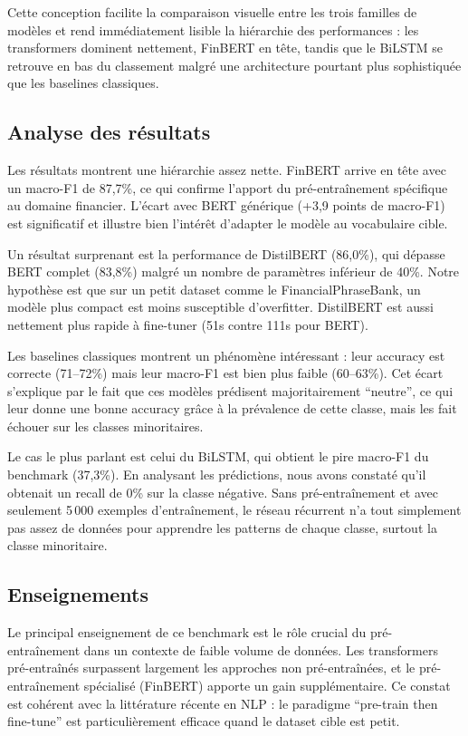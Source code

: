 \documentclass[12pt, a4paper]{article}
\begin{document}
Cette conception facilite la comparaison visuelle entre les trois familles de
modèles et rend immédiatement lisible la hiérarchie des performances : les
transformers dominent nettement, FinBERT en tête, tandis que le BiLSTM se retrouve
en bas du classement malgré une architecture pourtant plus sophistiquée que les
baselines classiques.

\subsection{Analyse des résultats}

Les résultats montrent une hiérarchie assez nette. FinBERT arrive en tête avec un
macro-F1 de 87,7\%, ce qui confirme l'apport du pré-entraînement spécifique au
domaine financier. L'écart avec BERT générique (+3,9 points de macro-F1) est
significatif et illustre bien l'intérêt d'adapter le modèle au vocabulaire cible.

Un résultat surprenant est la performance de DistilBERT (86,0\%), qui dépasse BERT
complet (83,8\%) malgré un nombre de paramètres inférieur de 40\%. Notre hypothèse
est que sur un petit dataset comme le FinancialPhraseBank, un modèle plus compact
est moins susceptible d'overfitter. DistilBERT est aussi nettement plus rapide à
fine-tuner (51s contre 111s pour BERT).

Les baselines classiques montrent un phénomène intéressant : leur accuracy est
correcte (71--72\%) mais leur macro-F1 est bien plus faible (60--63\%). Cet écart
s'explique par le fait que ces modèles prédisent majoritairement ``neutre'', ce qui
leur donne une bonne accuracy grâce à la prévalence de cette classe, mais les fait
échouer sur les classes minoritaires.

Le cas le plus parlant est celui du BiLSTM, qui obtient le pire macro-F1 du benchmark
(37,3\%). En analysant les prédictions, nous avons constaté qu'il obtenait un recall
de 0\% sur la classe négative. Sans pré-entraînement et avec seulement 5\,000
exemples d'entraînement, le réseau récurrent n'a tout simplement pas assez de
données pour apprendre les patterns de chaque classe, surtout la classe minoritaire.

\subsection{Enseignements}

Le principal enseignement de ce benchmark est le rôle crucial du pré-entraînement
dans un contexte de faible volume de données. Les transformers pré-entraînés
surpassent largement les approches non pré-entraînées, et le pré-entraînement
spécialisé (FinBERT) apporte un gain supplémentaire. Ce constat est cohérent avec
la littérature récente en NLP : le paradigme ``pre-train then fine-tune'' est
particulièrement efficace quand le dataset cible est petit.
\end{document}
